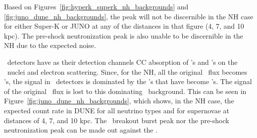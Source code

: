 Based on Figures~\ref{fig:hyperk_superk_nh_backgrounds} and \ref{fig:juno_dune_nh_backgrounds}, the peak
will not be discernible in the NH case for either Super-K or JUNO at
any of the distances in that figure (4, 7, and 10 kpc).  The
pre-shock neutronization peak is also unable to be discernible in the
NH due to the expected noise.





\ detectors have as their detection channels CC
absorption of \nue's and \anue's on the \ nuclei and electron
scattering.  Since, for the NH, all the original \nue\ flux becomes
\nuxpart's, the signal in \ detectors is dominated by the \nuxpart's that
have become \nue's.  The signal of the original \nue\ flux is lost to
this dominating \nuxpart\ background.  This can be seen in
Figure~\ref{fig:juno_dune_nh_backgrounds}, which shows, in the NH
case, the expected count rate
in DUNE for all neutrino types and 
for supernovae at distances of 4, 7, and 10 kpc.  
The \nue\ breakout burst peak nor the pre-shock
neutronization peak can be made out against the
\backgrounds.  


